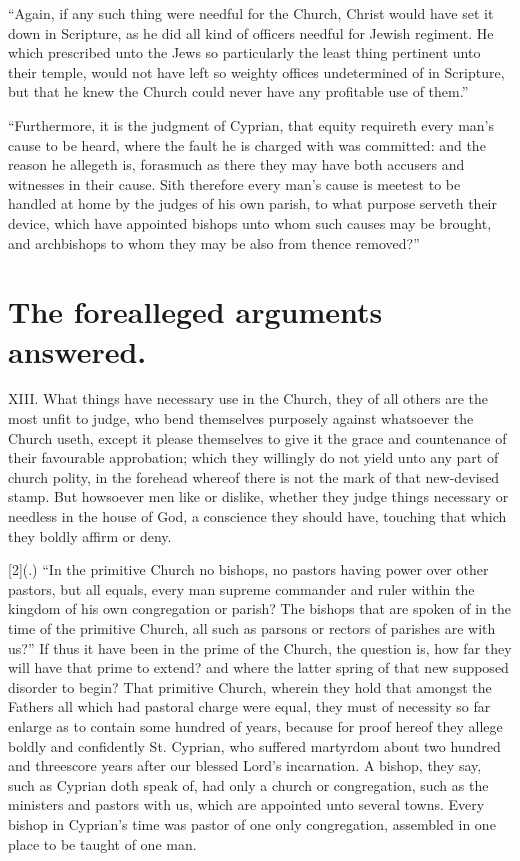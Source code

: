 “Again, if any such thing were needful for the Church, Christ would have set it down in Scripture, as he did all kind of officers needful for Jewish regiment. He which prescribed unto the Jews so particularly the least thing pertinent unto their temple, would not have left so weighty offices undetermined of in Scripture, but that he knew the Church could never have any profitable use of them.”

“Furthermore, it is the judgment of Cyprian, that equity requireth every man’s cause to be heard, where the fault he is charged with was committed: and the reason he allegeth is, forasmuch as there they may have both accusers and witnesses in their cause. Sith therefore every man’s cause is meetest to be handled at home by the judges of his own parish, to what purpose serveth their device, which  have appointed bishops unto whom such causes may be brought,
 and archbishops to whom they may be also from thence removed?”

\section*{The forealleged arguments answered.}

XIII. What things have necessary use in the Church, they of all others are the most unfit to judge, who bend themselves purposely against whatsoever the Church useth, except it please themselves to give it the grace and countenance of their favourable approbation; which they willingly do not yield unto any part of church polity, in the forehead whereof there is not the mark of that new-devised stamp. But howsoever men like or dislike, whether they judge things necessary or needless in the house of God, a conscience they should have, touching that which they boldly affirm or deny.

[2](.) “In the primitive Church no bishops, no pastors having power over other pastors, but all equals, every man supreme commander and ruler within the kingdom of his own congregation or parish? The bishops that are spoken of in the time of the primitive Church, all such as parsons or rectors of parishes are with us?” If thus it have been in the prime of the Church, the question is, how far they will have that prime to extend? and where the latter spring of that new supposed disorder to begin? That primitive Church, wherein they hold that amongst the Fathers all which had pastoral charge were equal, they must of necessity so far enlarge as to contain some hundred of years, because for proof hereof they allege boldly and confidently St. Cyprian, who suffered martyrdom about two hundred and threescore years after our blessed Lord’s incarnation. A bishop, they say, such as Cyprian doth speak of, had only a church or congregation, such as the ministers and pastors with us, which are appointed unto several towns. Every bishop in Cyprian’s time was pastor of one only congregation, assembled in one place to be taught of one man.

